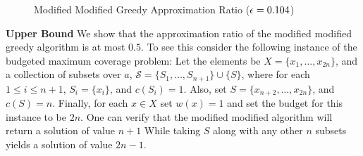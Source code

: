 \begin{figure}
\caption{
\label{fig:mmgreedy}
Modified Modified Greedy Approximation Ratio ($\epsilon = 0.104$)
}
\end{figure}

\textbf{Upper Bound}
We show that the approximation ratio of the modified modified greedy algorithm is at most $0.5$.
To see this consider the following instance of the budgeted maximum coverage problem:
Let the elements be $X = \{x_1, \dots, x_{2n}\}$, 
and a collection of subsets over $a$, $\mathcal{S} = \{S_1, \dots, S_{n + 1}\} \cup \{S\}$,
where for each $1 \leq i \leq n + 1$, $S_i = \{x_i\}$, and $c(S_i) = 1$. 
Also, set $S = \{x_{n + 2}, \dots, x_{2n}\}$, and $c(S) = n$.
Finally, for each $x \in X$ set $w(x) = 1$ and set the budget for this instance to be $2n$.
One can verify that the modified modified algorithm will return a solution of value $n + 1$
While taking $S$ along with any other $n$ subsets yields a solution of value $2n - 1$.  




